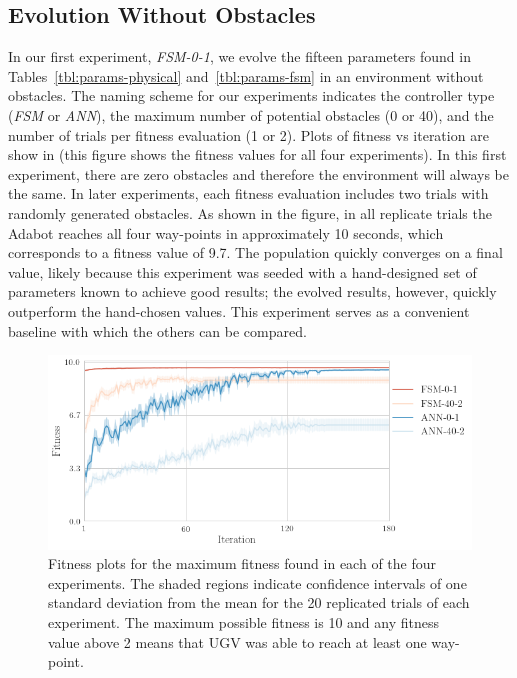 \subsection{Evolution Without Obstacles}

In our first experiment, \emph{FSM-0-1}, we evolve the fifteen parameters found in Tables~\ref{tbl:params-physical} and~\ref{tbl:params-fsm} in an environment without obstacles.
%
The naming scheme for our experiments indicates the controller type (\emph{FSM} or \emph{ANN}), the maximum number of potential obstacles (0 or 40), and the number of trials per fitness evaluation (1 or 2).
%
Plots of fitness vs iteration are show in  (this figure shows the fitness values for all four experiments).
%
In this first experiment, there are zero obstacles and therefore the environment will always be the same. In later experiments, each fitness evaluation includes two trials with randomly generated obstacles.
%
As shown in the figure, in all replicate trials the Adabot reaches all four way-points in approximately 10 seconds, which corresponds to a fitness value of 9.7.
%
The population quickly converges on a final value, likely because this experiment was seeded with a hand-designed set of parameters known to achieve good results; the evolved results, however, quickly outperform the hand-chosen values.
%
This experiment serves as a convenient baseline with which the others can be compared.

\begin{figure}[!ht]
    \centering

    \includegraphics[width=\columnwidth]{figures/4-results/fitness.png}

    \vspace{-0.1in}

    \caption{Fitness plots for the maximum fitness found in each of the four experiments. The shaded regions indicate confidence intervals of one standard deviation from the mean for the 20 replicated trials of each experiment. The maximum possible fitness is 10 and any fitness value above 2 means that UGV was able to reach at least one way-point.}
    \label{fig:fitness-vs-iteration}

    \vspace{-0.05in}
\end{figure}


